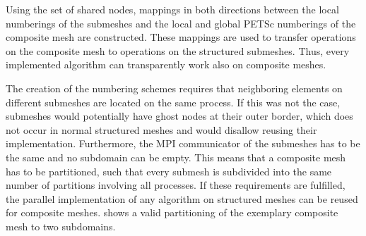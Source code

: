 Using the set of shared nodes, mappings in both directions between the local numberings of the submeshes and the local and global PETSc numberings of the composite mesh are constructed. These mappings are used to transfer operations on the composite mesh to operations on the structured submeshes. Thus, every implemented algorithm can transparently work also on composite meshes.

The creation of the numbering schemes requires that neighboring elements on different submeshes are located on the same process. If this was not the case, submeshes would potentially have ghost nodes at their outer border, which does not occur in normal structured meshes and would disallow reusing their implementation.
Furthermore, the MPI communicator of the submeshes has to be the same and no subdomain can be empty. This means that a composite mesh has to be partitioned, such that every submesh is subdivided into the same number of partitions involving all processes. If these requirements are fulfilled, the parallel implementation of any algorithm on structured meshes can be reused for composite meshes.
 shows a valid partitioning of the exemplary composite mesh to two subdomains.

